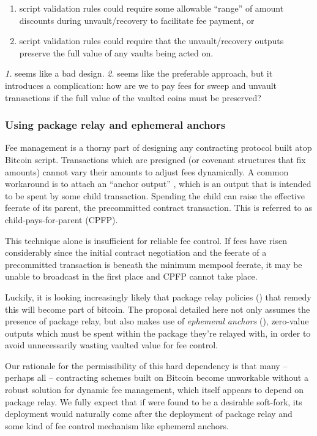 \documentclass[10pt]{article}
\begin{document}
\begin{enumerate}
  \item script validation rules could require some allowable ``range'' of
    amount discounts during unvault/recovery to facilitate fee payment, or

  \item script validation rules could require that the unvault/recovery
    outputs preserve the full value of any vaults being acted on. 

\end{enumerate}
\emph{1.} seems like a bad design. \emph{2.} seems like the preferable approach, but it
introduces a complication: how are we to pay fees for sweep and
unvault transactions if the full value of the vaulted coins must be preserved?

\subsubsection*{Using package relay and ephemeral anchors}

Fee management is a thorny part of designing any contracting protocol built atop
Bitcoin script. Transactions which are presigned (or covenant structures that fix
amounts) cannot vary their amounts to adjust fees dynamically. A common workaround is
to attach an ``anchor output'' \cite{OptechAnchors}, which is an output that is
intended to be spent by some child transaction. Spending the child can raise the
effective feerate of its parent, the precommitted contract transaction. This is
referred to as child-pays-for-parent (CPFP).

This technique alone is insufficient for reliable fee control. If fees have risen
considerably since the initial contract negotiation and the feerate of a precommitted
transaction is beneath the minimum mempool feerate, it may be unable to broadcast in
the first place and CPFP cannot take place.

Luckily, it is looking increasingly likely that package relay policies
(\cite{OptechPkgRelay}) that remedy this will become part of bitcoin. The \opv{}
proposal detailed here not only assumes the presence of package relay, but also makes
use of \emph{ephemeral anchors} (\cite{Anchors}), zero-value outputs which must be 
spent within the package they're relayed with, in order to avoid unnecessarily wasting
vaulted value for fee control.

Our rationale for the permissibility of this hard dependency is that many -- perhaps
all -- contracting schemes built on Bitcoin become unworkable without a robust solution
for dynamic fee management, which itself appears to depend on package relay. We fully
expect that if \opv{} were found to be a desirable soft-fork, its deployment would
naturally come after the deployment of package relay and some kind of fee control
mechanism like ephemeral anchors.
\end{document}
